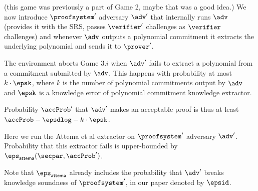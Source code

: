  {(this game was previously a part of Game 2, maybe that was a good idea.)}
  We now introduce $\proofsystem'$ adversary $\adv'$ that internally runs $\adv$ (provides
  it with the SRS, passes $\verifier'$ challenges as $\verifier$ challenges) and whenever
  $\adv$ outputs a polynomial commitment it extracts the underlying polynomial and sends
  it to $\prover'$.

The environment aborts Game $3.i$ when $\adv'$ fails to extract a polynomial from
a commitment submitted by $\adv$. This happens with probability at most $k \cdot \epsk$,
where $k$ is the number of polynomial commitments output by $\adv$ and $\epsk$ is a
knowledge error of polynomial commitment knowledge extractor.

Probability $\accProb'$ that $\adv'$ makes an acceptable proof is thus at least
$\accProb - \epsdlog - k \cdot \epsk$.

 { Here we run the Attema et al extractor on $\proofsystem'$ adversary
  $\adv'$. Probability that this extractor fails is upper-bounded by
  $\epsa (\secpar, \accProb')$.

  Note that $\epsa$ already includes the probability that $\adv'$ breaks knowledge soundness
  of $\proofsystem'$, in our paper denoted by $\epsid$.  }



